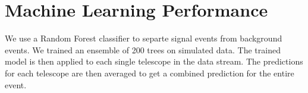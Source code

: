 \documentclass[11pt,twoside]{article}
\begin{document}


\section{Machine Learning Performance}

We use a Random Forest classifier to separte signal events from background events. We trained an ensemble of 200 trees
on simulated data. The trained model is then applied to each single telescope in the data stream. The predictions
for each telescope are then averaged to get a combined prediction for the entire event.






\end{document}
